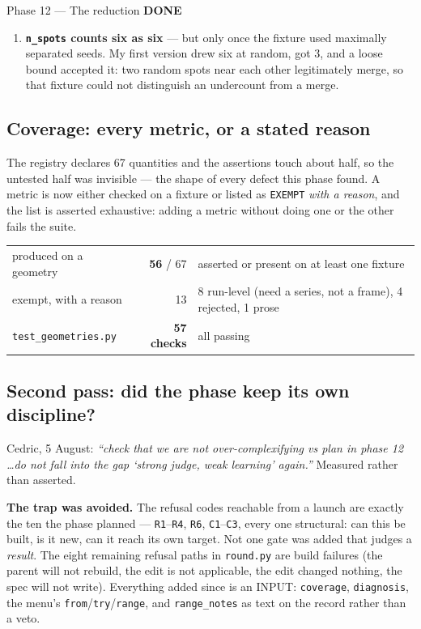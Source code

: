 \documentclass[11pt,a4paper]{article}
\newcommand{\code}[1]{\texttt{#1}}
\newcommand{\done}{\textcolor{good}{\textbf{DONE}}}
\begin{document}
\begin{phasebox}{Phase 12 --- The reduction \hfill \done}
\begin{enumerate}
\item \textbf{\code{n\_spots} counts six as six} --- but only once the fixture used maximally separated
seeds. My first version drew six at random, got 3, and a loose bound accepted it: two random spots near
each other legitimately merge, so that fixture could not distinguish an undercount from a merge.
\end{enumerate}

\subsection*{Coverage: every metric, or a stated reason}
The registry declares 67 quantities and the assertions touch about half, so the untested half was
invisible --- the shape of every defect this phase found. A metric is now either checked on a fixture
or listed as \code{EXEMPT} \emph{with a reason}, and the list is asserted exhaustive: adding a metric
without doing one or the other fails the suite.

\begin{center}\small
\begin{tabular}{lrl}
\toprule
produced on a geometry & \textbf{56} / 67 & asserted or present on at least one fixture \\
exempt, with a reason  & 13 & 8 run-level (need a series, not a frame), 4 rejected, 1 prose \\
\midrule
\code{test\_geometries.py} & \textbf{57 checks} & all passing \\
\bottomrule
\end{tabular}
\end{center}

\subsection*{Second pass: did the phase keep its own discipline?}
Cedric, 5 August: \emph{``check that we are not over-complexifying vs plan in phase 12 \dots do not
fall into the gap `strong judge, weak learning' again.''} Measured rather than asserted.

\textbf{The trap was avoided.} The refusal codes reachable from a launch are exactly the ten the phase
planned --- \code{R1}--\code{R4}, \code{R6}, \code{C1}--\code{C3}, every one structural: can this be
built, is it new, can it reach its own target. Not one gate was added that judges a \emph{result}. The
eight remaining refusal paths in \code{round.py} are build failures (the parent will not rebuild, the
edit is not applicable, the edit changed nothing, the spec will not write). Everything added since is
an INPUT: \code{coverage}, \code{diagnosis}, the menu's \code{from}/\code{try}/\code{range}, and
\code{range\_notes} as text on the record rather than a veto.


\end{phasebox}
\end{document}
